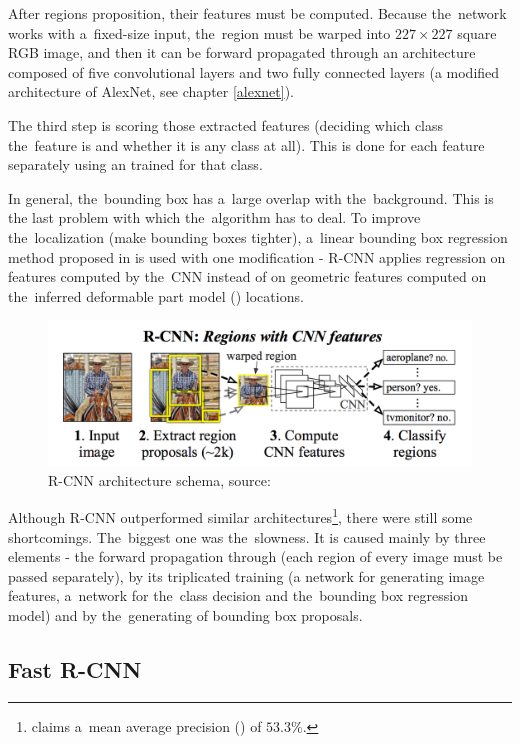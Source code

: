 After regions proposition, their features must be computed. Because the~network 
works with a~fixed-size input, the~region must be warped into $227 \times 227$ 
square RGB image, and then it can be forward propagated through an architecture 
composed of five convolutional layers and two fully connected layers (a modified 
architecture of AlexNet, see chapter \ref{alexnet}).

The third step is scoring those extracted features (deciding which class
the~feature is and whether it is any class at all). This is done for each feature 
separately using an  trained for that class.

In general, the~bounding box has a~large overlap with the~background. This is 
the last problem with which the~algorithm has to deal. To improve
the~localization (make bounding boxes tighter), a~linear bounding box regression 
method proposed in \cite{object-det} is used with one modification - R-CNN 
applies regression on features computed by the~CNN instead of on geometric 
features computed on the~inferred deformable part model () locations.

\begin{figure}[H]
   \centering
	\includegraphics[width=.9\linewidth]{./pictures/rcnn.png}
	\caption[R-CNN architecture]{R-CNN architecture schema, source: \cite{rcnn}}
      \label{fig:rcnn}
\end{figure}

Although R-CNN outperformed similar architectures\footnote{\cite{rcnn} claims
a~mean average precision () of $53.3 \%$.}, there were still some 
shortcomings. The~biggest one was the~slowness. It is caused mainly by three
elements - the forward propagation through  (each region of every image
must be passed separately), by its triplicated training (a network for
generating image features, a~network for the~class decision and the~bounding
box regression model) and by the~generating of bounding box proposals.

\subsection{Fast R-CNN}
\label{fast-rcnn}

